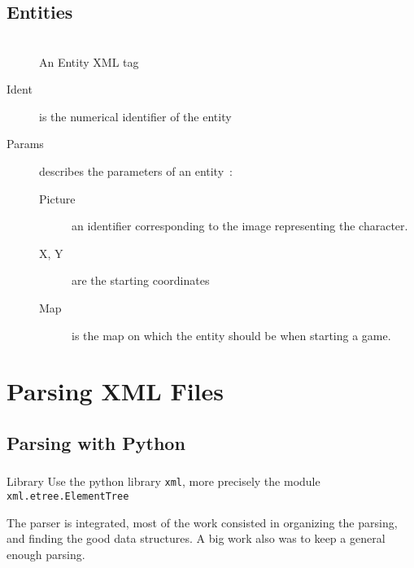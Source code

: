 \documentclass[a4paper, 11pt]{beamer}
\begin{document}
\subsection{Entities}

\begin{frame}
    \frametitle{\subsecname}
    \begin{figure}
        \begin{adjustwidth}{0.1\textwidth}{}
            \scriptsize{\inputminted{xml}{test_files/entity.xml}}
        \end{adjustwidth}
        \caption{An Entity XML tag}
    \end{figure}
    \begin{small}
        \begin{adjustwidth}{-0.1\textwidth}{}
            \begin{description}
                \item[Ident] is the numerical identifier of the entity
                \item[Params] describes the parameters of an entity~:
                    \begin{description}
                        \item[Picture] an identifier corresponding to the image
                            representing the character.
                        \item[X, Y] are the starting coordinates
                        \item[Map] is the map on which the entity should be
                            when starting a game.
                    \end{description}
            \end{description}
        \end{adjustwidth}
    \end{small}
\end{frame}

\section{Parsing XML Files}

\subsection{Parsing with Python}

\begin{frame}
    \frametitle{\subsecname}
    \begin{block}{Library}
        Use the python library \texttt{xml}, more precisely
        the module \texttt{xml.etree.ElementTree}
    \end{block}
    The parser is integrated, most of the work consisted in organizing
    the parsing, and finding the good data structures.
    A big work also was to keep a general enough parsing.
\end{frame}
\end{document}
